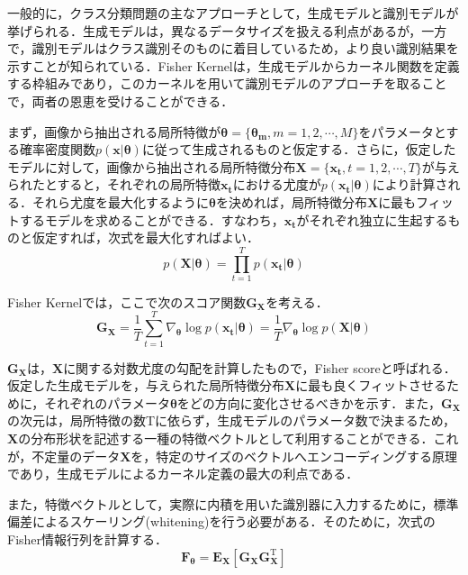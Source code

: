 一般的に，クラス分類問題の主なアプローチとして，生成モデルと識別モデルが挙げられる．生成モデルは，異なるデータサイズを扱える利点があるが，一方で，識別モデルはクラス識別そのものに着目しているため，より良い識別結果を示すことが知られている．Fisher Kernelは，生成モデルからカーネル関数を定義する枠組みであり，このカーネルを用いて識別モデルのアプローチを取ることで，両者の恩恵を受けることができる．

まず，画像から抽出される局所特徴が$ \bm{\theta} = \{\bm{\theta_m}, m=1,2,\cdots,M\}$をパラメータとする確率密度関数$ p(\bm{x}|\bm{\theta}) $に従って生成されるものと仮定する．さらに，仮定したモデルに対して，画像から抽出される局所特徴分布$ \bm{X} = \{\bm{x_t}, t=1,2,\cdots,T\} $が与えられたとすると，それぞれの局所特徴$ \bm{x_t} $における尤度が$ p(\bm{x_t}|\bm{\theta}) $により計算される．それら尤度を最大化するように$ \bm{\theta} $を決めれば，局所特徴分布$ \bm{X} $に最もフィットするモデルを求めることができる．すなわち，$ \bm{x_t} $がそれぞれ独立に生起するものと仮定すれば，次式を最大化すればよい．
%
\begin{equation}
\label{eq:likelihood}
{ p(\bm{X}|\bm{\theta}) = \prod_{t=1}^{T} p(\bm{x_t}|\bm{\theta}) }
\end{equation}

Fisher Kernelでは，ここで次のスコア関数$ \bm{G}_{\bm{X}} $を考える．
%
\begin{equation}
\label{eq:fisher_score}
{
\bm{G}_{\bm{X}} 
= \frac{1}{T} \sum_{t=1}^{T} \nabla_{\bm{\theta}} \log p(\bm{x_t}|\bm{\theta}) 
= \frac{1}{T} \nabla_{\bm{\theta}} \log p(\bm{X}|\bm{\theta}) 
}
\end{equation}

$ \bm{G}_{\bm{X}} $は，$ \bm{X} $に関する対数尤度の勾配を計算したもので，Fisher scoreと呼ばれる．仮定した生成モデルを，与えられた局所特徴分布$ \bm{X} $に最も良くフィットさせるために，それぞれのパラメータ$ \bm{\theta} $をどの方向に変化させるべきかを示す．また，$ \bm{G}_{\bm{X}} $の次元は，局所特徴の数Tに依らず，生成モデルのパラメータ数で決まるため，$ \bm{X} $の分布形状を記述する一種の特徴ベクトルとして利用することができる．これが，不定量のデータ$ \bm{X} $を，特定のサイズのベクトルへエンコーディングする原理であり，生成モデルによるカーネル定義の最大の利点である．

また，特徴ベクトルとして，実際に内積を用いた識別器に入力するために，標準偏差によるスケーリング(whitening)を行う必要がある．そのために，次式のFisher情報行列を計算する．
%
\begin{equation}
{ \bm{F_\theta} = \bm{E_X} \left[ \bm{G}_{\bm{X}}\bm{G}_{\bm{X}}^{\mathrm{T}} \right] }
\end{equation}

